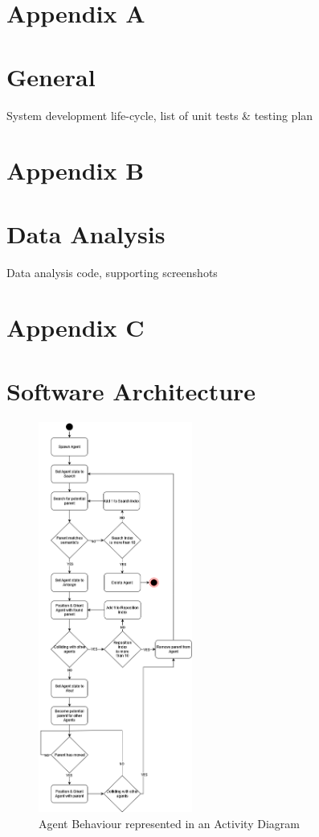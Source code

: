 \section*{Appendix A}
\section*{General}
\label{append:a}
System development life-cycle, list of unit tests \& testing plan

\section*{Appendix B}
\section*{Data Analysis}
\label{append:b}
Data analysis code, supporting screenshots

\newpage
\section*{Appendix C}
\section*{Software Architecture}
\label{append:c}
\begin{figure}[ht]
    \label{activity-diagram}
    \includegraphics[width=0.45\textwidth]{./Images/AgentActivityDiagram.png}
    \centering
    \caption{Agent Behaviour represented in an Activity Diagram}
\end{figure}